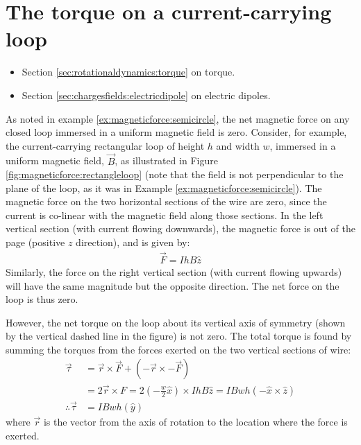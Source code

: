 \section{The torque on a current-carrying loop}
\begin{review}
	\begin{itemize}
		\item Section \ref{sec:rotationaldynamics:torque} on torque.
		\item Section \ref{sec:chargesfields:electricdipole} on electric dipoles.
	\end{itemize}
\end{review}
As noted in example \ref{ex:magneticforce:semicircle}, the net magnetic force on any closed loop immersed in a uniform magnetic field is zero. Consider, for example, the current-carrying rectangular loop of height $h$ and width $w$, immersed in a uniform magnetic field, $\vec B$, as illustrated in Figure \ref{fig:magneticforce:rectangleloop} (note that the field is not perpendicular to the plane of the loop, as it was in Example \ref{ex:magneticforce:semicircle}).
The magnetic force on the two horizontal sections of the wire are zero, since the current is co-linear with the magnetic field along those sections. In the left vertical section (with current flowing downwards), the magnetic force is out of the page (positive $z$ direction), and is given by:
\begin{align*}
\vec F = IhB\hat z
\end{align*}
Similarly, the force on the right vertical section (with current flowing upwards) will have the same magnitude but the opposite direction. The net force on the loop is thus zero. 

However, the net torque on the loop about its vertical axis of symmetry (shown by the vertical dashed line in the figure) is not zero. The total torque is found by summing the torques from the forces exerted on the two vertical sections of wire:
\begin{align*}
\vec \tau &= \vec r\times \vec F + (-\vec r \times - \vec F)\\
&= 2 \vec r \times F = 2 \left(-\frac{w}{2}\hat x\right) \times IhB\hat z = IBwh (-\hat x\times \hat z)\\
\therefore \vec \tau&=IBwh (\hat y)
\end{align*}
where $\vec r$ is the vector from the axis of rotation to the location where the force is exerted.

